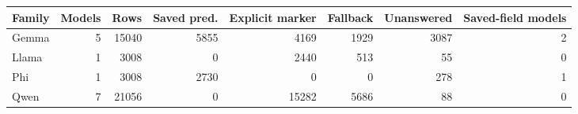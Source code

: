 \begin{tabular}{lrrrrrrr}
\toprule
Family & Models & Rows & Saved pred. & Explicit marker & Fallback & Unanswered & Saved-field models \\
\midrule
Gemma & 5 & 15040 & 5855 & 4169 & 1929 & 3087 & 2 \\
Llama & 1 & 3008 & 0 & 2440 & 513 & 55 & 0 \\
Phi & 1 & 3008 & 2730 & 0 & 0 & 278 & 1 \\
Qwen & 7 & 21056 & 0 & 15282 & 5686 & 88 & 0 \\
\bottomrule
\end{tabular}

